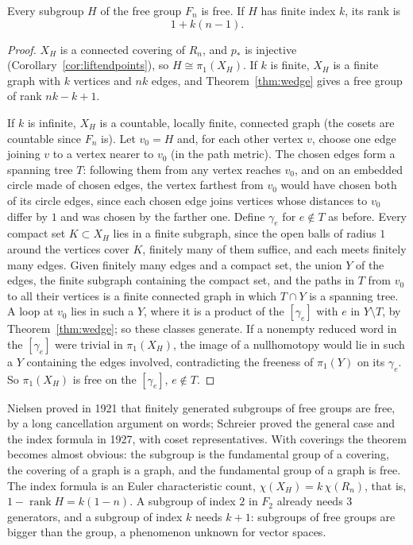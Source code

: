 \begin{theorem}\label{thm:nielsenschreier}
Every subgroup $H$ of the free group $F_n$ is free. If $H$ has finite index $k$, its rank is
\[1+k(n-1).\]
\end{theorem}

\begin{proof}
$X_H$ is a connected covering of $R_n$, and $p_*$ is injective (Corollary~\ref{cor:liftendpoints}), so $H\cong\pi_1(X_H)$. If $k$ is finite, $X_H$ is a finite graph with $k$ vertices and $nk$ edges, and
Theorem~\ref{thm:wedge} gives a free group of rank $nk-k+1$.

If $k$ is infinite, $X_H$ is a countable, locally finite, connected graph (the cosets are countable since $F_n$ is). Let $v_0=H$ and, for each other vertex $v$, choose one edge joining $v$ to a vertex
nearer to $v_0$ (in the path metric). The chosen edges form a spanning tree $T$: following them from any vertex reaches $v_0$, and on an embedded circle made of chosen edges, the vertex
farthest from $v_0$ would have chosen both of its circle edges, since each chosen edge joins vertices whose distances to $v_0$ differ by $1$ and was chosen by the farther one. Define $\gamma_e$ for $e\notin T$ as before. Every compact set $K\subset X_H$ lies in a finite subgraph, since the open balls of radius $1$ around the vertices cover $K$, finitely many of them suffice, and each meets finitely many edges.
Given finitely many edges and a compact set, the union $Y$ of the edges, the finite subgraph containing the compact set, and the paths in $T$ from $v_0$ to all their vertices is a finite
connected graph in which $T\cap Y$ is a spanning tree. A loop at $v_0$ lies in such a $Y$, where it is a product of the $[\gamma_e]$ with $e$ in $Y\setminus T$, by Theorem~\ref{thm:wedge}; so these classes
generate. If a nonempty reduced word in the $[\gamma_e]$ were trivial in $\pi_1(X_H)$, the image of a nullhomotopy would lie in such a $Y$ containing the edges involved, contradicting the freeness
of $\pi_1(Y)$ on its $\gamma_e$. So $\pi_1(X_H)$ is free on the $[\gamma_e]$, $e\notin T$.
\end{proof}

\begin{beauty}
Nielsen proved in 1921 that finitely generated subgroups of free groups are free, by a long cancellation argument on words; Schreier proved the general case and the index formula in 1927,
with coset representatives. With coverings the theorem becomes almost obvious: the subgroup is the fundamental group of a covering, the covering of a graph is a graph, and the
fundamental group of a graph is free. The index formula is an Euler characteristic count, $\chi(X_H)=k\,\chi(R_n)$, that is, $1-\operatorname{rank}H=k(1-n)$. A subgroup of index $2$ in $F_2$ already needs
$3$ generators, and a subgroup of index $k$ needs $k+1$: subgroups of free groups are bigger than the group, a phenomenon unknown for vector spaces.
\end{beauty}

